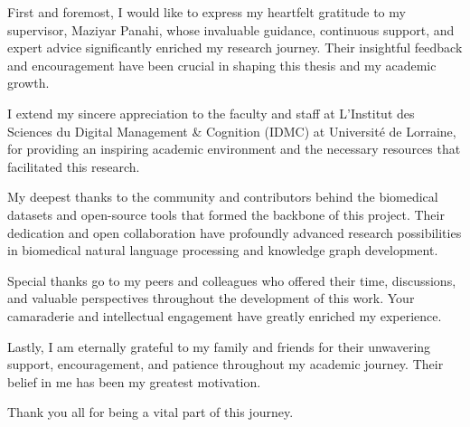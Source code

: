 \documentclass[
11pt, %
english, %
singlespacing, %
headsepline, %
]{MastersDoctoralThesis} %
\begin{document}
\begin{acknowledgements}
\addchaptertocentry{\acknowledgementname} %
First and foremost, I would like to express my heartfelt gratitude to my supervisor, Maziyar Panahi, whose invaluable guidance, continuous support, and expert advice significantly enriched my research journey. Their insightful feedback and encouragement have been crucial in shaping this thesis and my academic growth.

I extend my sincere appreciation to the faculty and staff at L'Institut des Sciences du Digital Management \& Cognition (IDMC) at Université de Lorraine, for providing an inspiring academic environment and the necessary resources that facilitated this research.

My deepest thanks to the community and contributors behind the biomedical datasets and open-source tools that formed the backbone of this project. Their dedication and open collaboration have profoundly advanced research possibilities in biomedical natural language processing and knowledge graph development.

Special thanks go to my peers and colleagues who offered their time, discussions, and valuable perspectives throughout the development of this work. Your camaraderie and intellectual engagement have greatly enriched my experience.

Lastly, I am eternally grateful to my family and friends for their unwavering support, encouragement, and patience throughout my academic journey. Their belief in me has been my greatest motivation.

Thank you all for being a vital part of this journey.
\end{acknowledgements}


\tableofcontents %

\listoffigures %

\listoftables %

\end{document}
